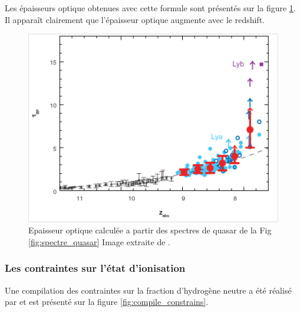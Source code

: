 Les épaisseurs optique obtenues avec cette formule sont présentés sur la figure \ref{fig:epaisseur_optique_quasar}.
Il apparaît clairement que l'épaisseur optique augmente avec le redshift.

\begin{figure}[bth]
        \includegraphics[width=.95\linewidth]{img/01/epaisseur_optique_quasar.png} 
        \caption{%
		Epaisseur optique calculée a partir des spectres de quasar de la Fig\,\ref{fig:spectre_quasar}
        Image extraite de \cite{fan_constraining_2006}.}
 		\label{fig:epaisseur_optique_quasar}
\end{figure}

\subsubsection{Les contraintes sur l'état d'ionisation}

Une compilation des contraintes sur la fraction d'hydrogène neutre a été réalisé par \cite{2015ApJ...811..140B} et est présenté sur la figure \ref{fig:compile_constrains}.

